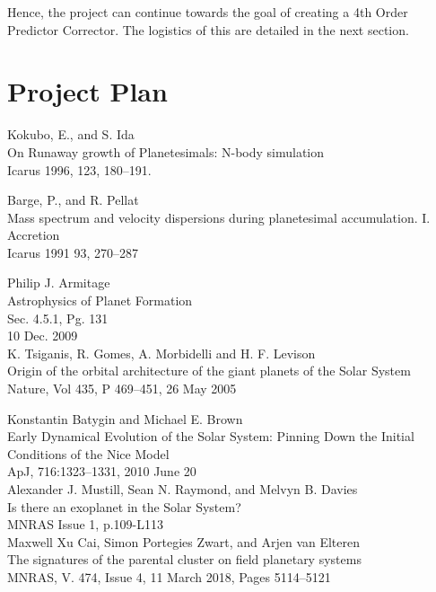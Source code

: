 \documentclass[a4paper,10pt]{article}
\begin{document}
Hence, the project can continue towards the goal of creating a 4th Order Predictor Corrector. The logistics of this are detailed in the next section.

\section{Project Plan}


\begin{thebibliography}{9}

Kokubo, E., and S. Ida\\
On Runaway growth of Planetesimals: N-body simulation\\ 
Icarus 1996, 123, 180--191.

Barge, P., and R. Pellat\\ 
Mass spectrum and velocity dispersions during planetesimal accumulation. I. Accretion\\
Icarus 1991 93, 270--287

Philip J. Armitage\\
Astrophysics of Planet Formation\\
Sec. 4.5.1, Pg. 131\\
10 Dec. 2009\\

K. Tsiganis, R. Gomes, A. Morbidelli and H. F. Levison\\
Origin of the orbital architecture of the giant planets of the Solar System\\ 
Nature, Vol 435, P 469--451, 26 May 2005

Konstantin Batygin and Michael E. Brown\\
Early Dynamical Evolution of the Solar System: Pinning Down the Initial Conditions of the Nice Model\\
 ApJ, 716:1323--1331, 2010 June 20\\

Alexander J. Mustill, Sean N. Raymond, and Melvyn B. Davies\\
Is there an exoplanet in the Solar System?\\
MNRAS Issue 1, p.109-L113\\

Maxwell Xu Cai, Simon Portegies Zwart, and Arjen van Elteren\\ 
The signatures of the parental cluster on field planetary systems\\
MNRAS, V. 474, Issue 4, 11 March 2018, Pages 5114--5121\\


\end{thebibliography}
\end{document}

